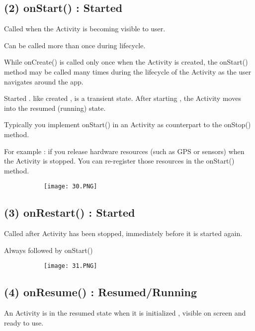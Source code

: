 \documentclass{article}
\begin{document}
\subsection{(2) onStart() : Started}

Called when the Activity is becoming visible to user.

Can be called more than once during lifecycle.

While onCreate() is called only once when the Activity is created, the onStart() method may be called many times during the lifecycle of the Activity as the user navigates around the app.

Started . like created , is a transient state. After starting , the Activity moves into the resumed (running) state.

Typically you implement onStart() in an Activity as counterpart to the onStop() method.

For example : if you release hardware resources (such as GPS or sensors) when the Activity is stopped. You can re-register those resources in the onStart() method.




      \begin{figure}[ht!]
  \centering
  \begin{subfigure}[b]{0.5\linewidth}
    \texttt{[image: 30.PNG]}
  \end{subfigure}
  \end{figure}

  \subsection{(3) onRestart() : Started}

  Called after Activity has been stopped, immediately before it is started again.

  Always followed by onStart()

        \begin{figure}[ht!]
  \centering
  \begin{subfigure}[b]{0.5\linewidth}
    \texttt{[image: 31.PNG]}
  \end{subfigure}
  \end{figure}

  \subsection{(4) onResume() : Resumed/Running}

An Activity is in the resumed state when it is initialized , visible on screen and ready to use.
\end{document}

